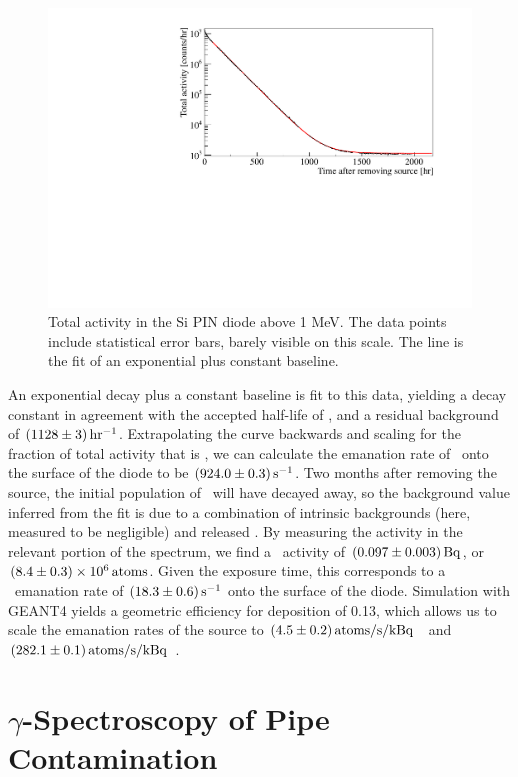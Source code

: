 \begin{figure}[htb]
\centering
\includegraphics[trim = 5 5 55 20, clip = true,width = 0.8\columnwidth]{figures/rnsource/opensourceactivity}
\caption{Total activity in the Si PIN diode above 1 MeV. The data points include statistical error bars, barely visible on this scale. The line is the fit of an exponential plus constant baseline.}
\label{fig:pindiodespectrum}
\end{figure}

An exponential decay plus a constant baseline is fit to this data, yielding a decay constant in agreement with the accepted half-life of \Ra, and a residual background of $(1128\pm3)\, \mathrm{hr^{-1}}$. Extrapolating the curve backwards and scaling for the fraction of total activity that is \Ra, we can calculate the emanation rate of \Ra~onto the surface of the diode to be $(924.0\pm0.3)\, \mathrm{s^{-1}}$. Two months after removing the source, the initial population of \Ra~will have decayed away, so the background value inferred from the fit is due to a combination of intrinsic backgrounds (here, measured to be negligible) and released \Th. By measuring the activity in the relevant portion of the spectrum, we find a \Th~activity of $(0.097\pm0.003)\, \mathrm{Bq}$, or $(8.4\pm0.3)\times10^6\, \mathrm{atoms}$. Given the exposure time, this corresponds to a \Th~emanation rate of $(18.3\pm0.6)\, \mathrm{s^{-1}}$ onto the surface of the diode. Simulation with GEANT4 yields a geometric efficiency for deposition of 0.13, which allows us to scale the emanation rates of the source to $(4.5\pm0.2)\, \mathrm{atoms/s/kBq}$ \Th~and $(282.1\pm0.1)\, \mathrm{atoms/s/kBq}$ \Ra.

\section{$\gamma$-Spectroscopy of Pipe Contamination}
\label{sec:flush}

